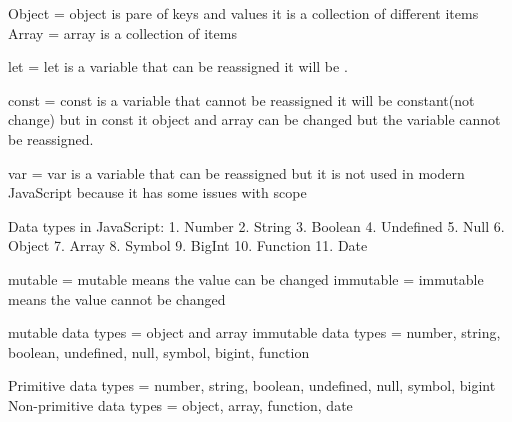 Object = object is pare of keys and values it is a collection of different items
Array = array is a collection of items



let = let is a variable that can be reassigned it will be .



const = const is a variable that cannot be reassigned it will be constant(not change)
but in const it object and array can be changed but the variable cannot be reassigned.



var = var is a variable that can be reassigned but it is not used in modern JavaScript because it has some issues with scope




Data types in JavaScript:
1. Number
2. String
3. Boolean
4. Undefined
5. Null
6. Object
7. Array
8. Symbol
9. BigInt
10. Function
11. Date    


mutable = mutable means the value can be changed
immutable = immutable means the value cannot be changed

mutable data types = object and array
immutable data types = number, string, boolean, undefined, null, symbol, bigint, function

Primitive data types = number, string, boolean, undefined, null, symbol, bigint
Non-primitive data types = object, array, function, date